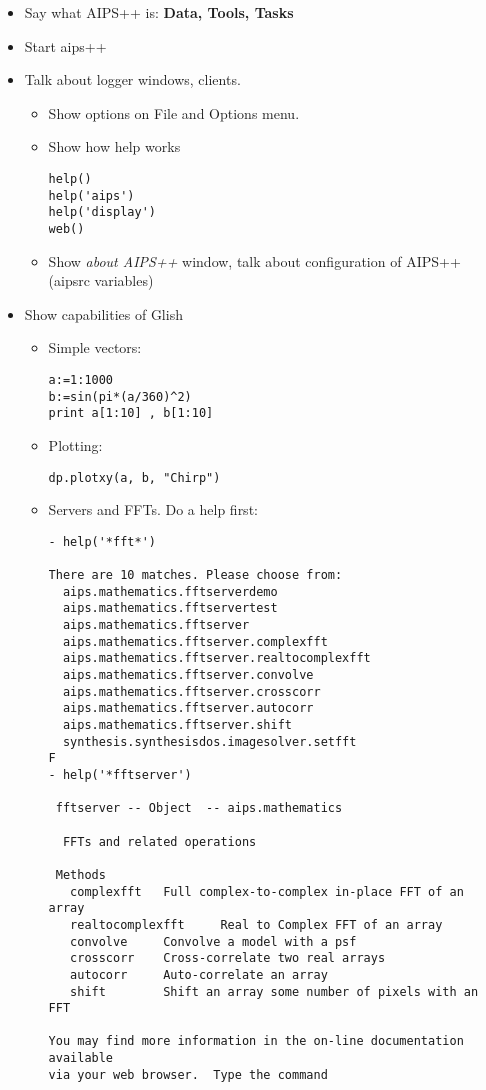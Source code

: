 \begin{itemize}
\item Say what AIPS++ is: {\bf Data, Tools, Tasks}
\item Start aips++
\item Talk about logger windows, clients. 
\begin{itemize}
\item Show options on File and Options menu. 
\item Show how help works
\begin{verbatim}
help()
help('aips')
help('display')
web()
\end{verbatim}
\item Show {\em about AIPS++} window, talk about configuration of
AIPS++ (aipsrc variables)
\end{itemize}
\item Show capabilities of Glish
\begin{itemize}
\item Simple vectors: 
\begin{verbatim}
a:=1:1000
b:=sin(pi*(a/360)^2)
print a[1:10] , b[1:10]
\end{verbatim}
\item Plotting: 
\begin{verbatim}
dp.plotxy(a, b, "Chirp")
\end{verbatim}
\item Servers and FFTs. Do a help first:
\begin{verbatim}
- help('*fft*')      

There are 10 matches. Please choose from:
  aips.mathematics.fftserverdemo
  aips.mathematics.fftservertest
  aips.mathematics.fftserver
  aips.mathematics.fftserver.complexfft
  aips.mathematics.fftserver.realtocomplexfft
  aips.mathematics.fftserver.convolve
  aips.mathematics.fftserver.crosscorr
  aips.mathematics.fftserver.autocorr
  aips.mathematics.fftserver.shift
  synthesis.synthesisdos.imagesolver.setfft
F 
- help('*fftserver')

 fftserver -- Object  -- aips.mathematics

  FFTs and related operations

 Methods
   complexfft   Full complex-to-complex in-place FFT of an array
   realtocomplexfft     Real to Complex FFT of an array
   convolve     Convolve a model with a psf
   crosscorr    Cross-correlate two real arrays
   autocorr     Auto-correlate an array
   shift        Shift an array some number of pixels with an FFT

You may find more information in the on-line documentation available
via your web browser.  Type the command


\end{verbatim}
\end{itemize}
\end{itemize}
